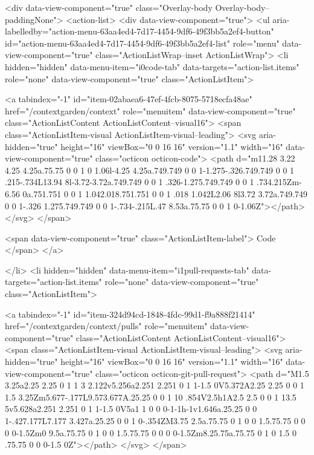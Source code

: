       <div data-view-component="true" class="Overlay-body Overlay-body--paddingNone">          <action-list>
  <div data-view-component="true">
    <ul aria-labelledby="action-menu-63aa4ed4-7d17-4454-9df6-49f3bb5a2ef4-button" id="action-menu-63aa4ed4-7d17-4454-9df6-49f3bb5a2ef4-list" role="menu" data-view-component="true" class="ActionListWrap--inset ActionListWrap">
        <li hidden="hidden" data-menu-item="i0code-tab" data-targets="action-list.items" role="none" data-view-component="true" class="ActionListItem">
    
    
    <a tabindex="-1" id="item-02abaea6-47ef-4fcb-8075-5718ecfa48ae" href="/contextgarden/context" role="menuitem" data-view-component="true" class="ActionListContent ActionListContent--visual16">
        <span class="ActionListItem-visual ActionListItem-visual--leading">
          <svg aria-hidden="true" height="16" viewBox="0 0 16 16" version="1.1" width="16" data-view-component="true" class="octicon octicon-code">
    <path d="m11.28 3.22 4.25 4.25a.75.75 0 0 1 0 1.06l-4.25 4.25a.749.749 0 0 1-1.275-.326.749.749 0 0 1 .215-.734L13.94 8l-3.72-3.72a.749.749 0 0 1 .326-1.275.749.749 0 0 1 .734.215Zm-6.56 0a.751.751 0 0 1 1.042.018.751.751 0 0 1 .018 1.042L2.06 8l3.72 3.72a.749.749 0 0 1-.326 1.275.749.749 0 0 1-.734-.215L.47 8.53a.75.75 0 0 1 0-1.06Z"></path>
</svg>
        </span>
      
        <span data-view-component="true" class="ActionListItem-label">
          Code
</span>      
</a>
  
</li>
        <li hidden="hidden" data-menu-item="i1pull-requests-tab" data-targets="action-list.items" role="none" data-view-component="true" class="ActionListItem">
    
    
    <a tabindex="-1" id="item-324d94cd-1848-4fdc-99d1-f9a888f21414" href="/contextgarden/context/pulls" role="menuitem" data-view-component="true" class="ActionListContent ActionListContent--visual16">
        <span class="ActionListItem-visual ActionListItem-visual--leading">
          <svg aria-hidden="true" height="16" viewBox="0 0 16 16" version="1.1" width="16" data-view-component="true" class="octicon octicon-git-pull-request">
    <path d="M1.5 3.25a2.25 2.25 0 1 1 3 2.122v5.256a2.251 2.251 0 1 1-1.5 0V5.372A2.25 2.25 0 0 1 1.5 3.25Zm5.677-.177L9.573.677A.25.25 0 0 1 10 .854V2.5h1A2.5 2.5 0 0 1 13.5 5v5.628a2.251 2.251 0 1 1-1.5 0V5a1 1 0 0 0-1-1h-1v1.646a.25.25 0 0 1-.427.177L7.177 3.427a.25.25 0 0 1 0-.354ZM3.75 2.5a.75.75 0 1 0 0 1.5.75.75 0 0 0 0-1.5Zm0 9.5a.75.75 0 1 0 0 1.5.75.75 0 0 0 0-1.5Zm8.25.75a.75.75 0 1 0 1.5 0 .75.75 0 0 0-1.5 0Z"></path>
</svg>
        </span>
      
